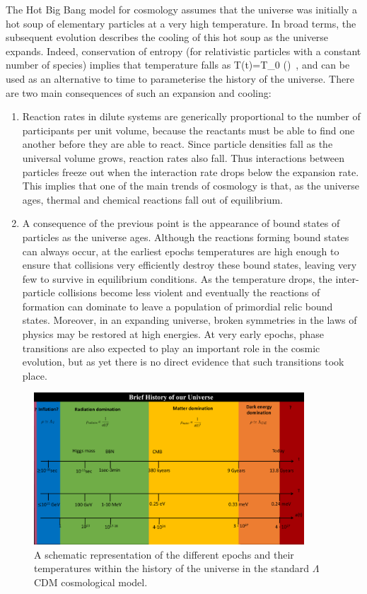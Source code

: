 The Hot Big Bang model for cosmology assumes that the universe was initially a hot soup of elementary particles at a very high temperature. In broad terms, the subsequent  evolution describes the cooling of this hot soup as the universe expands.  Indeed, conservation of entropy (for relativistic particles with a constant number of species) implies that temperature falls as 
\be
T(t)=T_0 \left(\right) \,,
\ee
and can be used as an alternative to time to parameterise the history of the universe.
There are two main consequences of such an expansion and cooling:
\begin{enumerate}
\item Reaction rates in dilute systems are generically proportional to the number of participants per unit volume, because the reactants must be able to find one another before they are able to react. Since  particle densities fall as the universal volume grows, reaction rates also fall. Thus interactions between particles freeze out when the interaction rate drops below the expansion rate. This implies that one of the main trends of cosmology is that, as the universe ages, thermal and chemical reactions fall out of equilibrium.

\item A consequence of the previous point is the appearance of bound states of particles as the universe ages. Although the reactions forming bound states can always occur, at the earliest epochs temperatures are high enough to ensure that collisions very efficiently destroy these bound states, leaving very few to survive in equilibrium conditions. As the temperature drops, the inter-particle collisions become less violent and eventually the reactions of formation can dominate to leave a population of primordial relic bound states. Moreover, in an expanding universe, broken symmetries in the laws of physics may be restored at high energies. At very early epochs, phase transitions are also expected to play an important role in the cosmic evolution, but as yet there is no direct evidence that such transitions took place.
\end{enumerate}

\begin{figure}[ht]
    \centering
    \includegraphics[width = 0.9\textwidth]{Sections/Figures/FigureHistory.pdf}
    \caption{A schematic representation of the different epochs and their temperatures within the history of the universe in
    the standard $\Lambda$CDM cosmological model.}
    \label{fig:History}
\end{figure}

